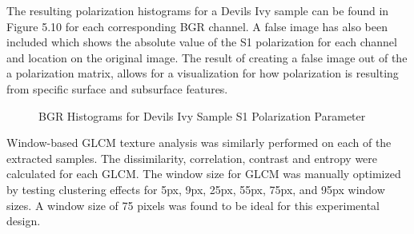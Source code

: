 %
The resulting polarization histograms for a Devils Ivy sample can be found in Figure 5.10 for each corresponding BGR channel.  A false image has also been included which shows the absolute value of the S1 polarization for each channel and location on the original image.  The result of creating a false image out of the a polarization matrix, allows for a visualization for how polarization is resulting from specific surface and subsurface features.
\begin{figure}
    \begin{center}
    \end{center}
    \caption{BGR Histograms for Devils Ivy Sample S1 Polarization Parameter}
    \label{fig:polarization}
\end{figure}
Window-based GLCM texture analysis was similarly performed on each of the extracted samples.  The dissimilarity, correlation, contrast and entropy were calculated for each GLCM.  The window size for GLCM was manually optimized by testing clustering effects for 5px, 9px, 25px, 55px, 75px, and 95px window sizes.  A window size of 75 pixels was found to be ideal for this experimental design.

